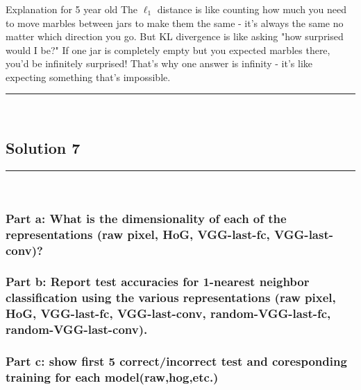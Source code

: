 \documentclass{article}
\begin{document}
\subsubsection*{\normalfont}{Explanation for 5 year old}
The $\ell_1$ distance is like counting how much you need to move marbles between jars to make them the same - it's always the same no matter which direction you go. But KL divergence is like asking "how surprised would I be?" If one jar is completely empty but you expected marbles there, you'd be infinitely surprised! That's why one answer is infinity - it's like expecting something that's impossible.

\noindent\rule{\textwidth}{0.4pt}\\

\newpage
\subsection*{Solution 7}
\noindent\rule{\textwidth}{0.4pt}\\
\subsubsection*{Part a:  What is the dimensionality of each of the representations (raw pixel, HoG, VGG-last-fc, VGG-last-conv)?}
\subsubsection*{Part b:  Report test accuracies for 1-nearest neighbor classification using the various representations (raw pixel, HoG, VGG-last-fc, VGG-last-conv, random-VGG-last-fc, random-VGG-last-conv).}
\subsubsection*{Part c:  show first 5 correct/incorrect test and coresponding training for each model(raw,hog,etc.)}
\end{document}
